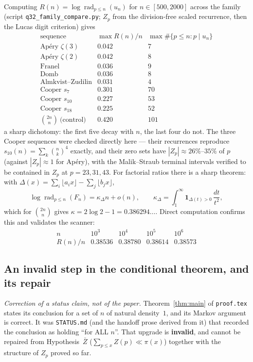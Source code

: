 Computing $R(n)=\log\operatorname{rad}_{p\le n}(u_n)$ for $n\in[500,2000]$ across the family
(script \texttt{q32\_family\_compare.py}; $Z_p$ from the division-free scaled recurrence, then
the Lucas digit criterion) gives
\[
\begin{array}{l|c|c}
 \text{sequence}&\max R(n)/n&\max\#\{p\le n:p\mid u_n\}\\ \hline
 \text{Ap\'ery }\zeta(3)&0.042&7\\
 \text{Ap\'ery }\zeta(2)&0.042&8\\
 \text{Franel}&0.036&9\\
 \text{Domb}&0.036&8\\
 \text{Almkvist--Zudilin}&0.031&4\\ \hline
 \text{Cooper }s_7&0.301&70\\
 \text{Cooper }s_{10}&0.227&53\\
 \text{Cooper }s_{18}&0.225&52\\
 \binom{2n}n\ \text{(control)}&0.420&101
\end{array}
\]
a sharp dichotomy: the first five decay with $n$, the last four do not.  The three Cooper
sequences were checked directly here — their recurrences reproduce
$s_{10}(n)=\sum_k\binom nk^4$ exactly, and their zero sets have
$|Z_p|\approx26\%$--$35\%$ of $p$ (against $|Z_p|\approx1$ for Ap\'ery), with the
Malik--Straub terminal intervals verified to be contained in $Z_p$ at $p=23,31,43$.  For factorial ratios there is a sharp
theorem: with $\Delta(x)=\sum_i\lfloor a_ix\rfloor-\sum_j\lfloor b_jx\rfloor$,
\[
  \log\operatorname{rad}_{p\le n}(F_n)=\kappa_\Delta n+o(n),
  \qquad \kappa_\Delta=\int_1^\infty\mathbf 1_{\Delta(t)>0}\,\frac{dt}{t^2},
\]
which for $\binom{2n}n$ gives $\kappa=2\log2-1=0.386294\ldots$.  Direct computation confirms
this and validates the scanner:
\[
\begin{array}{c|cccc}
 n&10^3&10^4&10^5&10^6\\ \hline
 R(n)/n&0.38536&0.38780&0.38614&0.38573
\end{array}
\]

\subsection{An invalid step in the conditional theorem, and its repair}
\label{subsec:audit}

\emph{Correction of a status claim, not of the paper.}  Theorem~\ref{thm:main} of
\texttt{proof.tex} states its conclusion for a set of $n$ of natural density~$1$, and its
Markov argument is correct.  It was \texttt{STATUS.md} (and the handoff prose derived from it)
that recorded the conclusion as holding ``for ALL $n$''.  That upgrade is \textbf{invalid},
and cannot be repaired from Hypothesis~$\bar Z$ ($\sum_{p\le x}Z(p)\ll\pi(x)$) together with
the structure of $Z_p$ proved so far.


